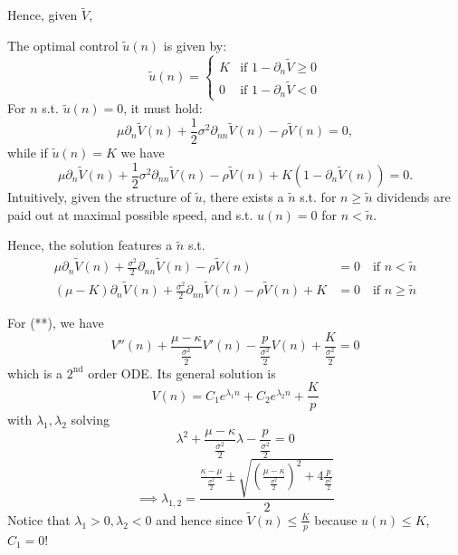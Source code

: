 Hence, given $\tilde{V}$,

\begin{remark}
    The optimal control $\tilde{u}(n)$ is given by:
    \[ \tilde{u}(n) = \begin{cases} K & \text{if } 1 - \partial_n \tilde{V} \geq 0 \\ 0 & \text{if } 1 - \partial_n \tilde{V} < 0 \end{cases} \]
    For $n$ s.t. $\tilde{u}(n) = 0$, it must hold:
    \[ \mu \partial_n \tilde{V}(n) + \frac{1}{2} \sigma^2 \partial_{nn} \tilde{V}(n) - \rho \tilde{V}(n) = 0, \]
    while if $\tilde{u}(n) = K$ we have
    \[ \mu \partial_n \tilde{V}(n) + \frac{1}{2} \sigma^2 \partial_{nn} \tilde{V}(n) - \rho \tilde{V}(n) + K \left( 1 - \partial_n \tilde{V}(n) \right) = 0. \]
    Intuitively, given the structure of $\tilde{u}$, there exists a $\tilde{n}$ s.t. for $n \geq \tilde{n}$ dividends are paid out at maximal possible speed, and s.t. $u(n) = 0$ for $n < \tilde{n}$.
    
    Hence, the solution features a  $\tilde{n}$ s.t.
    \begin{align*}
        \mu \partial_n \tilde{V}(n) + \frac{\sigma^2}{2} \partial_{nn} \tilde{V}(n) - \rho \tilde{V}(n) &= 0 \quad \text{if } n < \tilde{n} \tag{*} \\
        (\mu - K) \partial_n \tilde{V}(n) + \frac{\sigma^2}{2} \partial_{nn} \tilde{V}(n) - \rho \tilde{V}(n) + K &= 0 \quad \text{if } n \geq \tilde{n} \tag{**}
    \end{align*}
\end{remark}

\begin{remark}
    For (**), we have
    \[ V''(n) + \frac{\mu - \kappa}{\frac{\sigma^2}{2}} V'(n) - \frac{p}{\frac{\sigma^2}{2}} V(n) + \frac{K}{\frac{\sigma^2}{2}} = 0 \]
    which is a $2^{\text{nd}}$ order ODE. Its general solution is
    \[ V(n) = C_1 e^{\lambda_1 n} + C_2 e^{\lambda_2 n} + \frac{K}{p} \]
    with $\lambda_1, \lambda_2$ solving
    \[ \lambda^2 + \frac{\mu - \kappa}{\frac{\sigma^2}{2}} \lambda - \frac{p}{\frac{\sigma^2}{2}} = 0 \]
    \[ \implies \lambda_{1,2} = \frac{\frac{\kappa - \mu}{\frac{\sigma^2}{2}} \pm \sqrt{\left(\frac{\mu - \kappa}{\frac{\sigma^2}{2}}\right)^2 + 4 \frac{p}{\frac{\sigma^2}{2}}}}{2} \]
    Notice that $\lambda_1 > 0, \lambda_2 < 0$ and hence since $\tilde{V}(n) \leq \frac{K}{p}$ because $u(n) \leq K$, $C_1 = 0$!
\end{remark}

